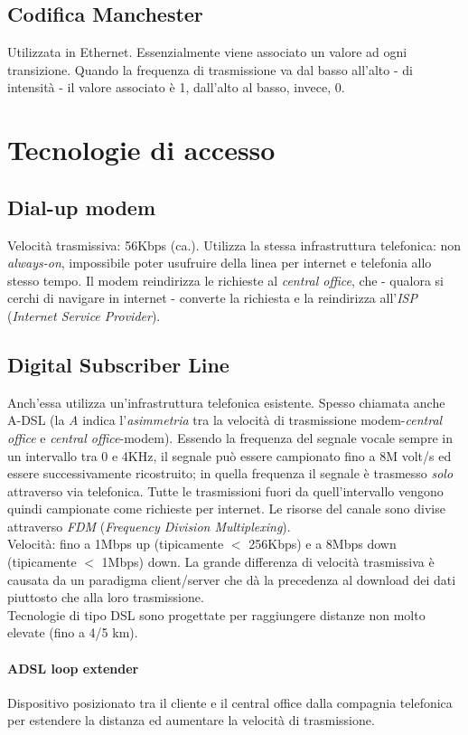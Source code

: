 \subsection{Codifica Manchester}
Utilizzata in Ethernet. Essenzialmente viene associato un valore ad ogni transizione. Quando la frequenza di trasmissione va dal basso all'alto - di intensità - il valore associato è 1, dall'alto al basso, invece, 0.

\section{Tecnologie di accesso}
\subsection{Dial-up modem}
Velocità trasmissiva: 56Kbps (ca.). Utilizza la stessa infrastruttura telefonica: non \textit{always-on}, impossibile poter usufruire della linea per internet e telefonia allo stesso tempo.
Il modem reindirizza le richieste al \textit{central office}, che - qualora si cerchi di navigare in internet - converte la richiesta e la reindirizza all'\textit{ISP} (\textit{Internet Service Provider}).

\subsection{Digital Subscriber Line}
Anch'essa utilizza un'infrastruttura telefonica esistente. Spesso chiamata anche A-DSL (la \textit{A} indica l'\textit{asimmetria} tra la velocità di trasmissione modem-\textit{central office} e \textit{central office}-modem).
Essendo la frequenza del segnale vocale sempre in un intervallo tra 0 e 4KHz, il segnale può essere campionato fino a 8M volt/s ed essere successivamente ricostruito; in quella frequenza il segnale è trasmesso \textit{solo} attraverso via telefonica. Tutte le trasmissioni fuori da quell'intervallo vengono quindi campionate come richieste per internet.
Le risorse del canale sono divise attraverso \textit{FDM} (\textit{Frequency Division Multiplexing}).\\
Velocità: fino a 1Mbps up (tipicamente $<$ 256Kbps) e a 8Mbps down (tipicamente $<$ 1Mbps) down. La grande differenza di velocità trasmissiva è causata da un paradigma client/server che dà la precedenza al download dei dati piuttosto che alla loro trasmissione.
\\
Tecnologie di tipo DSL sono progettate per raggiungere distanze non molto elevate (fino a 4/5 km).
\paragraph{ADSL loop extender} 
Dispositivo posizionato tra il cliente e il central office dalla compagnia telefonica per estendere la distanza ed aumentare la velocità di trasmissione.

